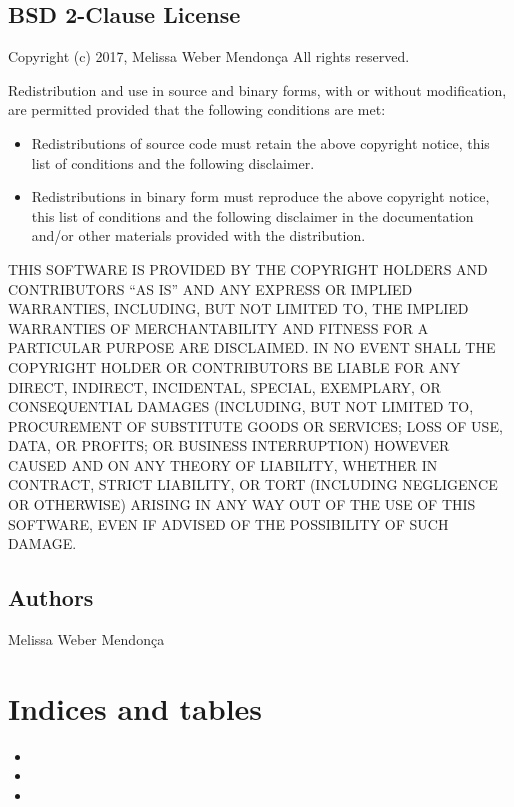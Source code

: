 \documentclass[a4paper,10pt,english]{sphinxmanual}
\begin{document}
\section{BSD 2-Clause License}
\label{\detokenize{license:bsd-2-clause-license}}\label{\detokenize{license::doc}}
Copyright (c) 2017, Melissa Weber Mendonça
All rights reserved.

Redistribution and use in source and binary forms, with or without
modification, are permitted provided that the following conditions are met:
\begin{itemize}
\item {} 
Redistributions of source code must retain the above copyright notice, this
list of conditions and the following disclaimer.

\item {} 
Redistributions in binary form must reproduce the above copyright notice,
this list of conditions and the following disclaimer in the documentation
and/or other materials provided with the distribution.

\end{itemize}

THIS SOFTWARE IS PROVIDED BY THE COPYRIGHT HOLDERS AND CONTRIBUTORS “AS IS”
AND ANY EXPRESS OR IMPLIED WARRANTIES, INCLUDING, BUT NOT LIMITED TO, THE
IMPLIED WARRANTIES OF MERCHANTABILITY AND FITNESS FOR A PARTICULAR PURPOSE ARE
DISCLAIMED. IN NO EVENT SHALL THE COPYRIGHT HOLDER OR CONTRIBUTORS BE LIABLE
FOR ANY DIRECT, INDIRECT, INCIDENTAL, SPECIAL, EXEMPLARY, OR CONSEQUENTIAL
DAMAGES (INCLUDING, BUT NOT LIMITED TO, PROCUREMENT OF SUBSTITUTE GOODS OR
SERVICES; LOSS OF USE, DATA, OR PROFITS; OR BUSINESS INTERRUPTION) HOWEVER
CAUSED AND ON ANY THEORY OF LIABILITY, WHETHER IN CONTRACT, STRICT LIABILITY,
OR TORT (INCLUDING NEGLIGENCE OR OTHERWISE) ARISING IN ANY WAY OUT OF THE USE
OF THIS SOFTWARE, EVEN IF ADVISED OF THE POSSIBILITY OF SUCH DAMAGE.


\section{Authors}
\label{\detokenize{authors:authors}}\label{\detokenize{authors::doc}}
Melissa Weber Mendonça





\chapter{Indices and tables}
\label{\detokenize{index:indices-and-tables}}\begin{itemize}
\item {} 

\item {} 

\item {} 

\end{itemize}
\end{document}
